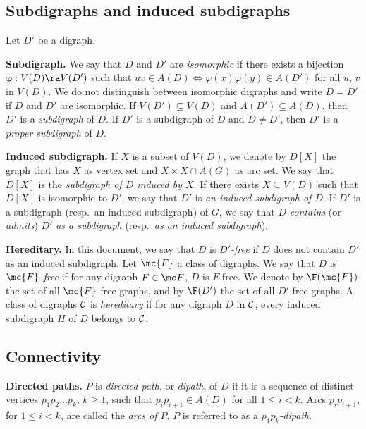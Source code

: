 \subsection{Subdigraphs and induced subdigraphs}

Let $D'$ be a digraph.

\medskip

\textbf{Subdigraph.}
We say that $D$ and $D'$ are \emph{isomorphic} if there exists a bijection $\varphi : V(D) \ra V(D')$ such that $uv \in A(D) \Leftrightarrow \varphi(x)\varphi(y) \in A(D')$ for all $u$, $v$ in $V(D)$.  
We do not distinguish between isomorphic digraphs and write $D=D'$ if $D$ and $D'$ are isomorphic. 
If $V(D') \subseteq V(D)$ and $A(D') \subseteq A(D)$, then $D'$  is a \emph{subdigraph} of $D$. If $D'$ is a subdigraph of $D$ and $D \neq D'$, then $D'$ is a \emph{proper subdigraph} of $D$.

\medskip

\textbf{Induced subdigraph.}
If $X$ is a subset of $V(D)$, we denote by $D[X]$ the graph that has $X$ as vertex set and ${X \times X} \cap A(G)$ as arc set. 
We say that $D[X]$ is the \emph{subdigraph of $D$ induced by $X$}. 
If there exists  $X  \subseteq V(D)$ such that $D[X]$ is isomorphic to $D'$, we say that $D'$ is \textit{an induced subdigraph of $D$}.
If $D'$ is a subdigraph (resp.\ an induced subdigraph) of $G$, we say that $D$ \textit{contains} (or \textit{admits}) $D'$ \textit{as a subdigraph} (resp.\ \textit{as an induced subdigraph}). 

\medskip

\textbf{Hereditary.}
In this document, we say that $D$ is  \emph{$D'$-free} if $D$ does not contain $D'$ as an induced subdigraph.
Let $\mc{F}$ a class of digraphs. We say that $D$ is $\mc{F}$\emph{-free} if for any digraph $F \in \mc F$, $D$ is $F$-free.
We denote by $\F(\mc{F})$ the set of all $\mc{F}$-free graphs, and by $\F(D')$ the set of all $D'$-free graphs.
 A class of digraphs $\cal C$ is \textit{hereditary} if for any digraph $D$ in $\cal C$, every induced subdigraph $H$ of $D$ belongs to $\cal C$. 

\subsection{Connectivity}

\textbf{Directed paths.}
$P$ is {\em directed path}, or \emph{dipath}, of $D$ if it is a sequence of distinct vertices $p_1p_2 \ldots p_k$,
$k\geq 1$, such that $p_i p_{i+1} \in A(D)$ for all $1\leq i < k$.
Arcs $p_i p_{i+1}$,  for  $1\leq i < k$, are called the {\em arcs of $P$}.
$P$ is referred to as a {\em $p_1p_k$-dipath}. 

